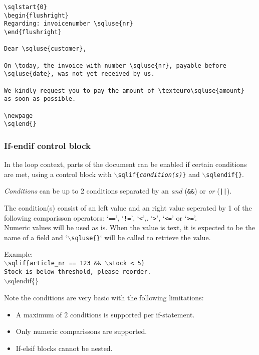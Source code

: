 \documentclass{article}
\newcommand{\bs}{\ensuremath{\backslash}}
\newcommand{\vs}{\vspace{3mm}}
\begin{document}
\noindent\begin{verbatim}
\sqlstart{0}
\begin{flushright}
Regarding: invoicenumber \sqluse{nr}
\end{flushright}

Dear \sqluse{customer},

On \today, the invoice with number \sqluse{nr}, payable before
\sqluse{date}, was not yet received by us.

We kindly request you to pay the amount of \texteuro\sqluse{amount}
as soon as possible.

\newpage
\sqlend{}
\end{verbatim}

\subsubsection{If-endif control block}

In the loop context, parts of the document can be enabled if certain conditions are met, using a control block with \texttt{\bs sqlif\{\textit{condition(s)}\}} and \texttt{\bs sqlendif\{\}}.

\vs

\textit{Conditions} can be up to 2 conditions separated by an \textit{and} (\texttt{\&\&}) or \textit{or} (\texttt{||}).

The condition(s) consist of an left value and an right value seperated by 1 of the following comparisson operators: `\texttt{==}', `\texttt{!=}', `\texttt{<}',. `\texttt{>}', `\texttt{<=}' or `\texttt{>=}'.\\
Numeric values will be used as is. When the value is text, it is expected to be the name of a field and `\texttt{\bs sqluse\{\}}` will be called to retrieve the value.
\vs

\noindent Example:\\
\texttt{\bs sqlif\{article\_nr == 123 \&\& \bs stock < 5\}\\
Stock is below threshold, please reorder.
}\\
\bs sqlendif\{\}

\vs

Note the conditions are very basic with the following limitations:
\begin{itemize}
\item A maximum of 2 conditions is supported per if-statement.
\item Only numeric comparissons are supported.
\item If-elsif blocks cannot be nested.
\end{itemize}
\end{document}
